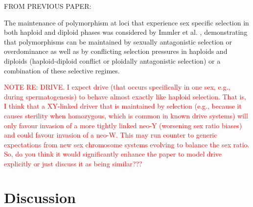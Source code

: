 \documentclass[12pt]{article}
\begin{document}
{\color{blue} 
\noindent FROM PREVIOUS PAPER:

The maintenance of polymorphism at loci that experience sex specific selection in both haploid and diploid phases was considered by Immler et al. \cite{Immler:2012tl}, demonstrating that polymorphisms can be maintained by sexually antagonistic selection or overdominance as well as by conflicting selection pressures in haploids and diploids (haploid-diploid conflict or ploidally antagonistic selection) or a combination of these selective regimes.  

}

\textcolor{red}{NOTE RE: DRIVE. I expect drive (that occurs specifically in one sex, e.g., during spermatogenesis) to behave almost exactly like haploid selection. That is, I think that a XY-linked driver that is maintained by selection (e.g., because it causes sterility when homozygous, which is common in known drive systems) will only favour invasion of a more tightly linked neo-Y (worsening sex ratio biases) and could favour invasion of a neo-W. This may run counter to generic expectations from new sex chromosome systems evolving to balance the sex ratio. So, do you think it would significantly enhance the paper to model drive explicitly or just discuss it as being similar???}

\linenumbers
\modulolinenumbers[2]

\section*{Discussion}
\end{document}
